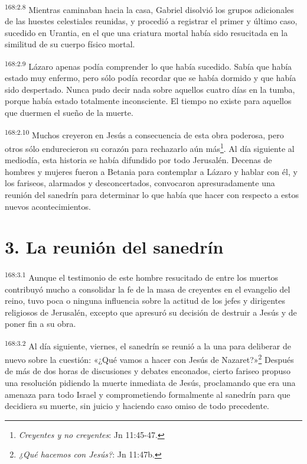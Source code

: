 \par
\textsuperscript{168:2.8} Mientras caminaban hacia la casa, Gabriel disolvió los grupos adicionales de las huestes celestiales reunidas, y procedió a registrar el primer y último caso, sucedido en Urantia, en el que una criatura mortal había sido resucitada en la similitud de su cuerpo físico mortal.

\par
\textsuperscript{168:2.9} Lázaro apenas podía comprender lo que había sucedido. Sabía que había estado muy enfermo, pero sólo podía recordar que se había dormido y que había sido despertado. Nunca pudo decir nada sobre aquellos cuatro días en la tumba, porque había estado totalmente inconsciente. El tiempo no existe para aquellos que duermen el sueño de la muerte.

\par
\textsuperscript{168:2.10} Muchos creyeron en Jesús a consecuencia de esta obra poderosa, pero otros sólo endurecieron su corazón para rechazarlo aún más\footnote{\textit{Creyentes y no creyentes}: Jn 11:45-47.}. Al día siguiente al mediodía, esta historia se había difundido por todo Jerusalén. Decenas de hombres y mujeres fueron a Betania para contemplar a Lázaro y hablar con él, y los fariseos, alarmados y desconcertados, convocaron apresuradamente una reunión del sanedrín para determinar lo que había que hacer con respecto a estos nuevos acontecimientos.

\section*{3. La reunión del sanedrín}
\par
\textsuperscript{168:3.1} Aunque el testimonio de este hombre resucitado de entre los muertos contribuyó mucho a consolidar la fe de la masa de creyentes en el evangelio del reino, tuvo poca o ninguna influencia sobre la actitud de los jefes y dirigentes religiosos de Jerusalén, excepto que apresuró su decisión de destruir a Jesús y de poner fin a su obra.

\par
\textsuperscript{168:3.2} Al día siguiente, viernes, el sanedrín se reunió a la una para deliberar de nuevo sobre la cuestión: «¿Qué vamos a hacer con Jesús de Nazaret?»\footnote{\textit{¿Qué hacemos con Jesús?}: Jn 11:47b.} Después de más de dos horas de discusiones y debates enconados, cierto fariseo propuso una resolución pidiendo la muerte inmediata de Jesús, proclamando que era una amenaza para todo Israel y comprometiendo formalmente al sanedrín para que decidiera su muerte, sin juicio y haciendo caso omiso de todo precedente.

